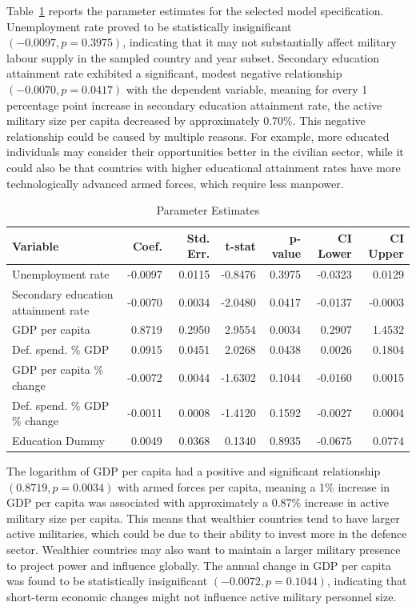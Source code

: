 Table~\ref{tab:final_model} reports the parameter estimates for the selected model specification. 
Unemployment rate proved to be statistically insignificant $(-0.0097, p=0.3975)$, indicating that it may not substantially affect military labour supply in the sampled country and year subset.
Secondary education attainment rate exhibited a significant, modest negative relationship $(-0.0070, p=0.0417)$ with the dependent variable, meaning for every 1 percentage point increase in secondary education attainment rate, the active military size per capita decreased by approximately 0.70\%.
This negative relationship could be caused by multiple reasons. For example, more educated individuals may consider their opportunities better in the civilian sector, while it could also be that countries with higher educational attainment rates have more technologically advanced armed forces, which require less manpower.

\begin{table}[htbp]
\caption{Parameter Estimates}
\centering
\begin{threeparttable}
\begin{tabularx}{\textwidth}{@{}Xrrrrrr@{}}
\toprule
\textbf{Variable} & \textbf{Coef.} & \textbf{Std. Err.} & \textbf{t-stat} & \textbf{p-value} & \textbf{CI Lower} & \textbf{CI Upper} \\
\midrule
Unemployment rate & -0.0097 & 0.0115 & -0.8476 & 0.3975 & -0.0323 & 0.0129 \\
Secondary education attainment rate & -0.0070 & 0.0034 & -2.0480 & 0.0417 & -0.0137 & -0.0003 \\
GDP per capita & 0.8719 & 0.2950 & 2.9554 & 0.0034 & 0.2907 & 1.4532 \\
Def. spend. \% GDP & 0.0915 & 0.0451 & 2.0268 & 0.0438 & 0.0026 & 0.1804 \\
GDP per capita \% change & -0.0072 & 0.0044 & -1.6302 & 0.1044 & -0.0160 & 0.0015 \\
Def. spend. \% GDP \% change & -0.0011 & 0.0008 & -1.4120 & 0.1592 & -0.0027 & 0.0004 \\
Education Dummy & 0.0049 & 0.0368 & 0.1340 & 0.8935 & -0.0675 & 0.0774 \\
\bottomrule
\end{tabularx}
\end{threeparttable}
\label{tab:final_model}
\end{table}

The logarithm of GDP per capita had a positive and significant relationship $(0.8719, p=0.0034)$ with armed forces per capita, meaning a 1\% increase in GDP per capita was associated with approximately a 0.87\% increase in active military size per capita. 
This means that wealthier countries tend to have larger active militaries, which could be due to their ability to invest more in the defence sector. 
Wealthier countries may also want to maintain a larger military presence to project power and influence globally.
The annual change in GDP per capita was found to be statistically insignificant $(-0.0072, p=0.1044)$, indicating that short-term economic changes might not influence active military personnel size. 

